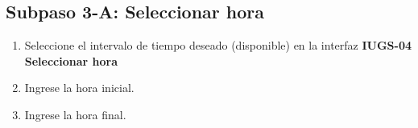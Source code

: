 \subsection{Subpaso 3-A: Seleccionar hora}
\begin{enumerate}
	\item Seleccione el intervalo de tiempo deseado (disponible) en la interfaz  \textbf{IUGS-04 Seleccionar hora}
	\item Ingrese la hora inicial.
	\item Ingrese la hora final.
\end{enumerate}